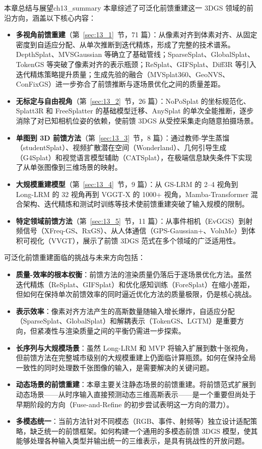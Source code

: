 \begin{futurebox}{本章总结与展望}{ch13_summary}
本章综述了可泛化前馈重建这一 3DGS 领域的前沿方向，涵盖以下核心内容：
\begin{itemize}
\item \textbf{多视角前馈重建}（第~\ref{sec:13_1}~节，71 篇）：从像素对齐到体素对齐、从固定密度到自适应分配、从单次推断到迭代精炼，形成了完整的技术谱系。DepthSplat、MVSGaussian 等确立了基础管线；SparseSplat、GlobalSplat、TokenGS 等突破了像素对齐的表示瓶颈；ReSplat、GIFSplat、Diff3R 等引入迭代精炼策略提升质量；生成先验的融合（MVSplat360、GeoNVS、ConFixGS）进一步弥合了前馈推断与逐场景优化之间的质量差距。
\item \textbf{无标定与自由视角}（第~\ref{sec:13_2}~节，26 篇）：NoPoSplat 的坐标规范化、Splatt3R 和 FreeSplatter 的基础模型迁移、AnySplat 的单次全能推断，逐步消除了对已知相机位姿的依赖，使前馈 3DGS 从受控采集走向随意拍摄场景。
\item \textbf{单图到 3D 前馈方法}（第~\ref{sec:13_3}~节，8 篇）：通过教师-学生蒸馏（studentSplat）、视频扩散潜在空间（Wonderland）、几何引导生成（G4Splat）和视觉语言模型辅助（CATSplat），在极端信息缺失条件下实现了从单张图像到三维场景的映射。
\item \textbf{大规模重建模型}（第~\ref{sec:13_4}~节，9 篇）：从 GS-LRM 的 2--4 视角到 Long-LRM 的 32 视角再到 VGGT-X 的 1000+ 视角，Mamba-Transformer 混合架构、迭代精炼和测试时训练等技术使前馈重建突破了输入规模的限制。
\item \textbf{特定领域前馈方法}（第~\ref{sec:13_5}~节，11 篇）：从事件相机（EvGGS）到射频信号（XFreq-GS、RxGS）、从人体通信（GPS-Gaussian+、VoluMe）到体积可视化（VVGT），展示了前馈 3DGS 范式在多个领域的广泛适用性。
\end{itemize}

可泛化前馈重建面临的挑战与未来方向包括：
\begin{itemize}
\item \textbf{质量-效率的根本权衡}：前馈方法的渲染质量仍落后于逐场景优化方法。虽然迭代精炼（ReSplat、GIFSplat）和优化感知训练（ForeSplat）在缩小差距，但如何在保持单次前馈效率的同时逼近优化方法的质量极限，仍是核心挑战。
\item \textbf{表示效率}：像素对齐方法产生的高斯数量随输入增长爆炸，自适应分配（SparseSplat、GlobalSplat）和解耦表示（TokenGS、LGTM）是重要方向，但紧凑性与渲染质量之间的平衡仍需进一步探索。
\item \textbf{长序列与大规模场景}：虽然 Long-LRM 和 MVP 将输入扩展到数十张视角，但前馈方法在完整城市级别的大规模重建上仍面临计算瓶颈。如何在保持全局一致性的同时处理数千张图像的输入，是需要解决的关键问题。
\item \textbf{动态场景的前馈重建}：本章主要关注静态场景的前馈重建。将前馈范式扩展到动态场景——从时序输入直接预测动态三维高斯表示——是一个重要但尚处于早期阶段的方向（Fuse-and-Refine 的初步尝试表明这一方向的潜力）。
\item \textbf{多模态统一}：当前方法针对不同模态（RGB、事件、射频等）独立设计适配策略，缺乏统一的前馈框架。如何构建一个通用的多模态前馈 3DGS 模型，使其能够处理各种输入类型并输出统一的三维表示，是具有挑战性的开放问题。
\end{itemize}
\end{futurebox}
